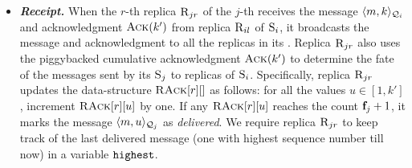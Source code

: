 \begin{itemize}[wide]
 


\item {\bf \em Receipt.}
When the $r$-th replica $\textsc{R}_{{j}{r}}$ of the $j$-th \RSM{} receives the 
message $\langle m, k\rangle_{\mathcal{Q}_{i}}$ and acknowledgment $\textsc{Ack}(k')$ from replica $\textsc{R}_{{i}{l}}$ of \RSM{} $\textsc{S}_{i}$,
it broadcasts the message and acknowledgment to all the replicas in its \RSM{}.
Replica $\textsc{R}_{{j}{r}}$ also uses the piggybacked cumulative acknowledgment $\textsc{Ack}(k')$ to determine the fate of the 
messages sent by its \RSM{} $\textsc{S}_{j}$ to replicas of \RSM{} $\textsc{S}_{i}$.
Specifically, replica $\textsc{R}_{{j}{r}}$ updates the data-structure $\textsc{RAck}[{r}][{}]$ as follows:
for all the values $u \in [1,k']$, increment $\textsc{RAck}[{r}][{u}]$ by one.
If any $\textsc{RAck}[{r}][{u}]$ reaches the count $\textbf{f}_{j}+1$, it marks the message $\langle m, u\rangle_{\mathcal{Q}_{j}}$ 
as {\em delivered}.
We require replica $\textsc{R}_{{j}{r}}$ to keep track of the last delivered message  (one with highest sequence number till now)
in a variable $\texttt{highest}{}$.

%


\end{itemize}


%
%




